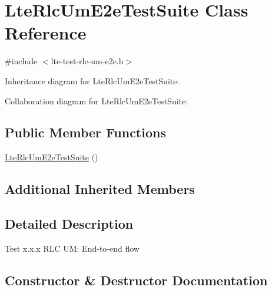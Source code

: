 \hypertarget{classLteRlcUmE2eTestSuite}{}\section{Lte\+Rlc\+Um\+E2e\+Test\+Suite Class Reference}
\label{classLteRlcUmE2eTestSuite}


{\ttfamily \#include $<$lte-\/test-\/rlc-\/um-\/e2e.\+h$>$}



Inheritance diagram for Lte\+Rlc\+Um\+E2e\+Test\+Suite\+:


Collaboration diagram for Lte\+Rlc\+Um\+E2e\+Test\+Suite\+:
\subsection*{Public Member Functions}
\begin{DoxyCompactItemize}
\item 
\hyperlink{classLteRlcUmE2eTestSuite_aef3c5d2903de981517d067cffe601178}{Lte\+Rlc\+Um\+E2e\+Test\+Suite} ()
\end{DoxyCompactItemize}
\subsection*{Additional Inherited Members}


\subsection{Detailed Description}
Test x.\+x.\+x R\+LC UM\+: End-\/to-\/end flow 

\subsection{Constructor \& Destructor Documentation}
